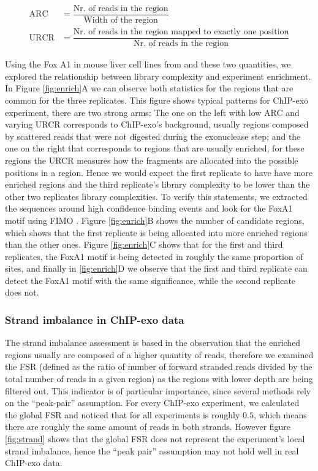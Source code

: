 \documentclass{bmcart}\usepackage[]{graphicx}\usepackage[]{color}
\begin{document}
\begin{align*}
  \text{ARC} &= \dfrac{\text{Nr. of reads in the region}}{\text{Width of the region}} \\
  \text{URCR} &= \dfrac{\text{Nr. of reads in the region mapped to
      exactly one position}}{\text{Nr. of reads in the region}}
\end{align*}

Using the Fox A1 in mouse liver cell lines from \cite{exoillumina} and
these two quantities, we explored the relationship between library
complexity and experiment enrichment. In Figure \ref{fig:enrich}A we
can observe both statistics for the regions that are common for the
three replicates. This figure shows typical patterns for ChIP-exo
experiment, there are two strong arms: The one on the left with low
ARC and varying URCR corresponds to ChIP-exo's background, usually
regions composed by scattered reads that were not digested during the
exonuclease step; and the one on the right that corresponds to regions
that are usually enriched, for these regions the URCR measures how the
fragments are allocated into the possible positions in a region. Hence
we would expect the first replicate to have have more enriched regions
and the third replicate's library complexity to be lower than the
other two replicates library complexities. To verify this statements,
we extracted the sequences around high confidence binding events and
look for the FoxA1 motif using FIMO \cite{fimo}. Figure
\ref{fig:enrich}B shows the number of candidate regions, which shows
that the first replicate is being allocated into more enriched regions
than the other ones. Figure \ref{fig:enrich}C shows that for the first
and third replicates, the FoxA1 motif is being detected in roughly the
same proportion of sites, and finally in \ref{fig:enrich}D we observe
that the first and third replicate can detect the FoxA1 motif with the
same significance, while the second replicate does not.

\subsubsection{Strand imbalance in ChIP-exo data}

The strand imbalance assessment is based in the observation that the
enriched regions usually are composed of a higher quantity of reads,
therefore we examined the FSR (defined as the ratio of number of
forward stranded reads divided by the total number of reads in a given
region) as the regions with lower depth are being filtered out. This
indicator is of particular importance, since several methods rely on
the ``peak-pair'' assumption. For every ChIP-exo experiment, we
calculated the global FSR and noticed that for all experiments is
roughly $0.5$, which means there are roughly the same amount of reads
in both strands. However figure \ref{fig:strand} shows that the global
FSR does not represent the experiment's local strand imbalance, hence
the ``peak pair'' assumption may not hold well in real ChIP-exo data.
\end{document}
